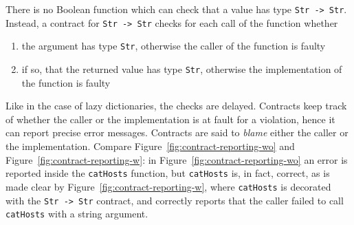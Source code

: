 \documentclass[sigplan,screen,10pt]{acmart}
\newcommand{\nickel}[1]{\lstinline[language=nickel]{#1}}
\begin{document}
There is no Boolean function which can check that a value has type
\nickel{Str -> Str}. Instead, a contract for \nickel{Str -> Str}
checks for each call of the function whether
\begin{enumerate}
\item the argument has type \nickel{Str}, otherwise the caller of the
  function is faulty
\item if so, that the returned value has type \nickel{Str}, otherwise
  the implementation of the function is faulty
\end{enumerate}

Like in the case of lazy dictionaries, the checks are delayed.
Contracts keep track of whether the caller or the implementation is
at fault for a violation, hence it can report precise error
messages. Contracts are said to \emph{blame} either the caller or the
implementation. Compare Figure~\ref{fig:contract-reporting-wo} and
Figure~\ref{fig:contract-reporting-w}: in
Figure~\ref{fig:contract-reporting-wo} an error is reported inside the
\nickel{catHosts} function, but \nickel{catHosts} is, in fact,
correct, as is made clear by Figure~\ref{fig:contract-reporting-w},
where \nickel{catHosts} is decorated with the \nickel{Str -> Str}
contract, and correctly reports that the caller failed to call
\nickel{catHosts} with a string argument.
\end{document}
